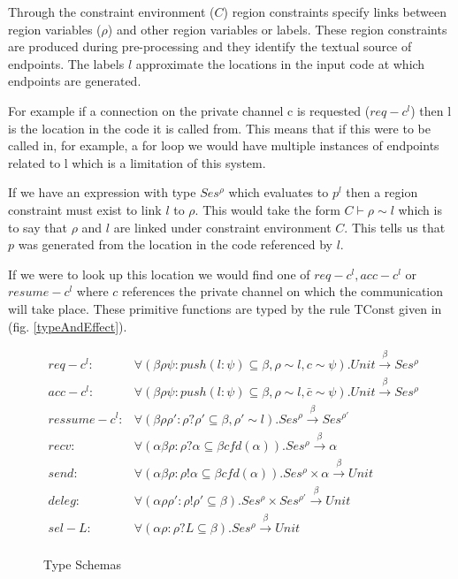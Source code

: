 Through the constraint environment ($C$) region constraints specify links between region variables ($\rho$) and other region variables or labels. These region constraints are produced during pre-processing and they identify the textual source of endpoints. The labels $l$ approximate the locations in the input code at which endpoints are generated.

For example if a connection on the private channel c is requested ($req-c^l$) then l is the location in the code it is called from. This means that if this were to be called in, for example, a for loop we would have multiple instances of endpoints related to l which is a limitation of this system. 

If we have an expression with type $Ses^\rho$ which evaluates to $p^l$ then a region constraint must exist to link $l$ to $\rho$. This would take the form $C\vdash \rho  \sim l$ which is to say that $\rho$ and $l$ are linked under constraint environment $C$. This tells us that $p$ was generated from the location in the code referenced by $l$.

If we were to look up this location we would find one of $req-c^l, acc-c^l$ or $resume-c^l$ where $c$ references the private channel on which the communication will take place. These primitive functions are typed by the rule TConst given in (fig. \ref{typeAndEffect}).

\begin{figure}
\begin{align*}
 req-c^l : & \forall(\beta \rho \psi:push(l:\psi) \subseteq \beta, \rho \sim l, c \sim \psi).Unit  \overset{\beta}{\rightarrow} Ses^\rho\\ 
 acc-c^l : & \forall(\beta \rho \psi:push(l:\psi) \subseteq \beta, \rho \sim l, \bar{c} \sim \psi).Unit  \overset{\beta}{\rightarrow} Ses^\rho \\
 ressume-c^l :&  \forall(\beta \rho \rho':\rho ? \rho' \subseteq \beta, \rho' \sim l).Ses^{\rho}  \overset{\beta}{\rightarrow} Ses^{\rho'} \\
 recv : &\forall(\alpha \beta \rho : \rho ? \alpha \subseteq \beta cfd(\alpha)).Ses^{\rho} \overset{\beta}{\rightarrow} \alpha \\
 send : &\forall(\alpha \beta \rho : \rho ! \alpha \subseteq \beta cfd(\alpha)).Ses^{\rho} \times \alpha \overset{\beta}{\rightarrow} Unit \\
 deleg :& \forall(\alpha \rho \rho' : \rho ! \rho' \subseteq \beta ).Ses^{\rho} \times Ses^{\rho'} \overset{\beta}{\rightarrow} Unit \\
 sel-L :& \forall(\alpha \rho : \rho ? L \subseteq \beta ).Ses^{\rho}  \overset{\beta}{\rightarrow} Unit \\
\end{align*}
\caption{Type Schemas}
\label{ts}
\end{figure}

